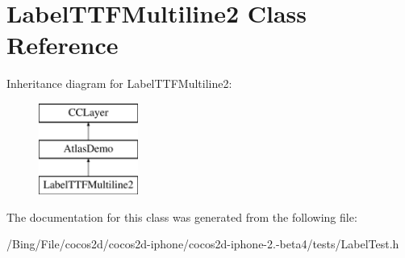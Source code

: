 \hypertarget{interface_label_t_t_f_multiline2}{\section{Label\-T\-T\-F\-Multiline2 Class Reference}
\label{interface_label_t_t_f_multiline2}
}
Inheritance diagram for Label\-T\-T\-F\-Multiline2\-:\begin{figure}[H]
\begin{center}
\leavevmode
\includegraphics[height=3.000000cm]{interface_label_t_t_f_multiline2}
\end{center}
\end{figure}


The documentation for this class was generated from the following file\-:\begin{DoxyCompactItemize}
\item 
/\-Bing/\-File/cocos2d/cocos2d-\/iphone/cocos2d-\/iphone-\/2.-\/beta4/tests/Label\-Test.\-h\end{DoxyCompactItemize}
